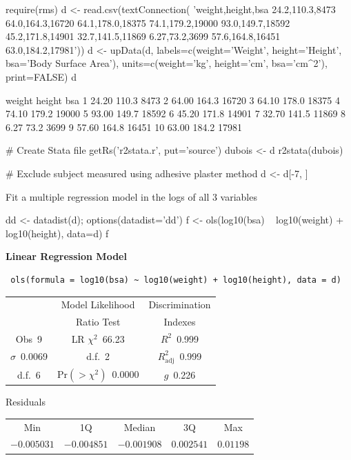 \begin{Schunk}
\begin{Sinput}
require(rms)
d <- read.csv(textConnection(
'weight,height,bsa
24.2,110.3,8473
64.0,164.3,16720
64.1,178.0,18375
74.1,179.2,19000
93.0,149.7,18592
45.2,171.8,14901
32.7,141.5,11869
6.27,73.2,3699
57.6,164.8,16451
63.0,184.2,17981'))
d <- upData(d, labels=c(weight='Weight', height='Height',
                        bsa='Body Surface Area'),
            units=c(weight='kg', height='cm', bsa='cm^2'), print=FALSE)
d
\end{Sinput}
\begin{Soutput}
   weight height   bsa
1   24.20  110.3  8473
2   64.00  164.3 16720
3   64.10  178.0 18375
4   74.10  179.2 19000
5   93.00  149.7 18592
6   45.20  171.8 14901
7   32.70  141.5 11869
8    6.27   73.2  3699
9   57.60  164.8 16451
10  63.00  184.2 17981
\end{Soutput}
\begin{Sinput}
# Create Stata file
getRs('r2stata.r', put='source')
dubois <- d
r2stata(dubois)
\end{Sinput}
\begin{Sinput}
# Exclude subject measured using adhesive plaster method
d <- d[-7, ]
\end{Sinput}
\end{Schunk}
Fit a multiple regression model in the logs of all 3 variables\ipacue
\begin{Sinput}
dd <- datadist(d); options(datadist='dd')
f <- ols(log10(bsa) ~ log10(weight) + log10(height), data=d)
f
\end{Sinput}

 \centerline{\textbf{Linear Regression Model}}
 
 \begin{verbatim}
 ols(formula = log10(bsa) ~ log10(weight) + log10(height), data = d)
 \end{verbatim}
 
 {\selectfont \begin{center}\begin{tabular}{|c|c|c|}\hline
&Model Likelihood&Discrimination\\
&Ratio Test&Indexes\\\hline
Obs~\hfill 9&LR $\chi^{2}$~\hfill 66.23&$R^{2}$~\hfill 0.999\\
$\sigma$~\hfill 0.0069&d.f.~\hfill 2&$R^{2}_{\textrm{adj}}$~\hfill 0.999\\
d.f.~\hfill 6&Pr$(>\chi^{2})$~\hfill 0.0000&$g$~\hfill 0.226\\
\hline
\end{tabular}
\end{center}}
 \begin{center}
 Residuals
 

 \begin{tabular}{ccccc}
Min&1Q&Median&3Q&Max\\
$-0.005031$&$-0.004851$&$-0.001908$&$0.002541$&$0.01198$\\
\end{tabular}
 \end{center}
 
